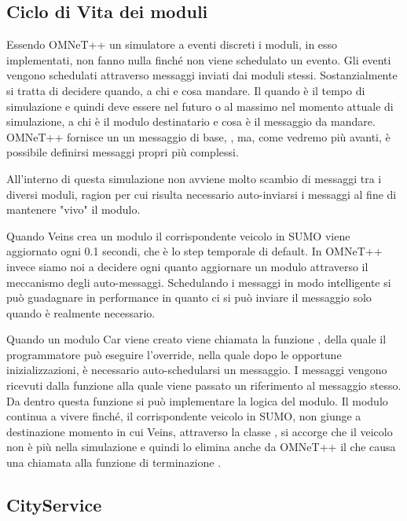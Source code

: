 \subsection{Ciclo di Vita dei moduli}

Essendo OMNeT++ un simulatore a eventi discreti i moduli, in esso implementati, non fanno nulla finché non viene schedulato un evento. Gli eventi vengono schedulati attraverso messaggi inviati dai moduli stessi. Sostanzialmente si tratta di decidere quando, a chi e cosa mandare.
Il quando è il tempo di simulazione e quindi deve essere nel futuro o al massimo nel momento attuale di simulazione, a chi è il modulo destinatario e cosa è il messaggio da mandare. OMNeT++ fornisce un un messaggio di base, , ma, come vedremo più avanti, è possibile definirsi messaggi propri più complessi.

All'interno di questa simulazione non avviene molto scambio di messaggi tra i diversi moduli, ragion per cui risulta necessario auto-inviarsi i messaggi al fine di mantenere "vivo" il modulo.

Quando Veins crea un modulo il corrispondente veicolo in SUMO viene aggiornato ogni 0.1 secondi, che è lo step temporale di default. In OMNeT++ invece siamo noi a decidere ogni quanto aggiornare un modulo attraverso il meccanismo degli auto-messaggi. Schedulando i messaggi in modo intelligente si può guadagnare in performance in quanto ci si può inviare il messaggio solo quando è realmente necessario.

Quando un modulo Car viene creato viene chiamata la funzione , della quale il programmatore può eseguire l'override, nella quale dopo le opportune inizializzazioni, è necessario auto-schedularsi un messaggio. I messaggi vengono ricevuti dalla funzione  alla quale viene passato un riferimento al messaggio stesso. Da dentro questa funzione si può implementare la logica del modulo. Il modulo continua a vivere finché, il corrispondente veicolo in SUMO, non giunge a destinazione momento in cui Veins, attraverso la classe , si accorge che il veicolo non è più nella simulazione e quindi lo elimina anche da OMNeT++ il che causa una chiamata alla funzione di terminazione .

\subsection{CityService}\label{sec:module-city}

